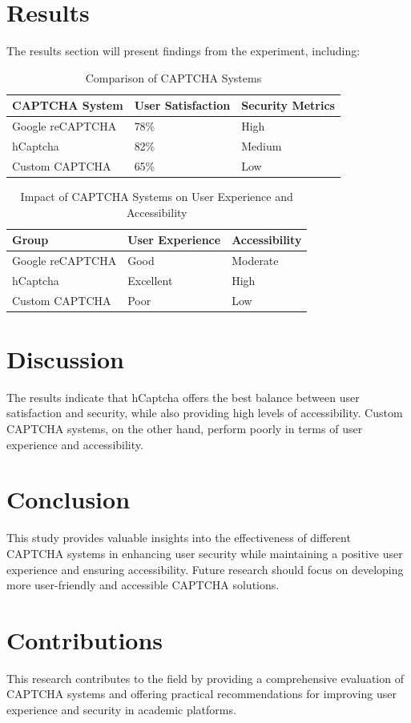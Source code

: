 \documentclass{article}
\begin{document}
\section{Results}
The results section will present findings from the experiment, including:

\begin{table}[ht]
\centering
\begin{tabularx}{\textwidth}{|X|X|X|}
\hline
\textbf{CAPTCHA System} & \textbf{User Satisfaction} & \textbf{Security Metrics} \\
\hline
Google reCAPTCHA & 78\% & High \\
hCaptcha & 82\% & Medium \\
Custom CAPTCHA & 65\% & Low \\
\hline
\end{tabularx}
\caption{Comparison of CAPTCHA Systems}
\label{tab:capcha_comparison}
\end{table}

\begin{table}[ht]
\centering
\begin{tabularx}{\textwidth}{|X|X|X|}
\hline
\textbf{Group} & \textbf{User Experience} & \textbf{Accessibility} \\
\hline
Google reCAPTCHA & Good & Moderate \\
hCaptcha & Excellent & High \\
Custom CAPTCHA & Poor & Low \\
\hline
\end{tabularx}
\caption{Impact of CAPTCHA Systems on User Experience and Accessibility}
\label{tab:user_experience}
\end{table}

\section{Discussion}
The results indicate that hCaptcha offers the best balance between user satisfaction and security, while also providing high levels of accessibility. Custom CAPTCHA systems, on the other hand, perform poorly in terms of user experience and accessibility.

\section{Conclusion}
This study provides valuable insights into the effectiveness of different CAPTCHA systems in enhancing user security while maintaining a positive user experience and ensuring accessibility. Future research should focus on developing more user-friendly and accessible CAPTCHA solutions.

\section{Contributions}
This research contributes to the field by providing a comprehensive evaluation of CAPTCHA systems and offering practical recommendations for improving user experience and security in academic platforms.
\end{document}
